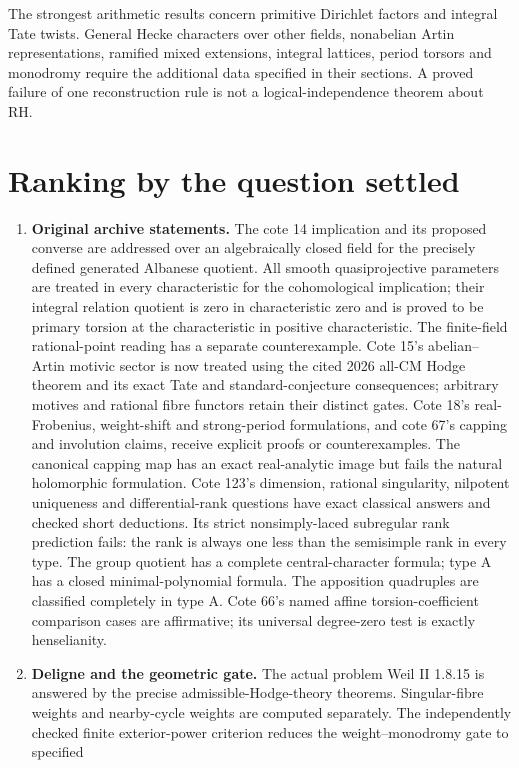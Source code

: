 \documentclass[11pt,a4paper]{article}
\theoremstyle{definition}\newtheorem{definition}[theorem]{Definition}
\theoremstyle{remark}\newtheorem{remark}[theorem]{Remark}
\begin{document}
The strongest arithmetic results concern primitive Dirichlet factors
and integral Tate twists. General Hecke characters over other fields,
nonabelian Artin representations, ramified mixed extensions, integral
lattices, period torsors and monodromy require the additional data
specified in their sections. A proved failure of one reconstruction
rule is not a logical-independence theorem about RH.

\section*{Ranking by the question settled}
\begin{enumerate}
\item \textbf{Original archive statements.} The cote 14 implication and
its proposed converse are addressed over an algebraically closed field
for the precisely defined generated Albanese quotient. All smooth
quasiprojective parameters are treated in every characteristic for the
cohomological implication; their integral relation quotient is zero in
characteristic zero and is proved to be primary torsion at the
characteristic in positive characteristic. The finite-field rational-point reading
has a separate counterexample. Cote 15's abelian--Artin motivic sector is
now treated using the cited 2026 all-CM Hodge theorem and its exact Tate
and standard-conjecture consequences; arbitrary motives and rational
fibre functors retain their distinct gates. Cote 18's real-Frobenius,
weight-shift and strong-period formulations, and cote 67's capping and
involution claims, receive explicit proofs or counterexamples.
The canonical capping map has an exact real-analytic image but fails
the natural holomorphic formulation. Cote 123's dimension, rational
singularity, nilpotent uniqueness and differential-rank questions have
exact classical answers and checked short deductions. Its strict
nonsimply-laced subregular rank prediction fails: the rank is always
one less than the semisimple rank in every type. The group quotient has a complete
central-character formula; type A has a closed minimal-polynomial
formula. The apposition quadruples are classified completely in type A.
Cote 66's named affine torsion-coefficient comparison cases are
affirmative; its universal degree-zero test is exactly henselianity.
\item \textbf{Deligne and the geometric gate.} The actual problem
Weil II 1.8.15 is answered by the precise admissible-Hodge-theory
theorems. Singular-fibre weights and nearby-cycle weights are computed
separately. The independently checked finite exterior-power criterion reduces the weight--monodromy gate to specified

\end{enumerate}
\end{document}
